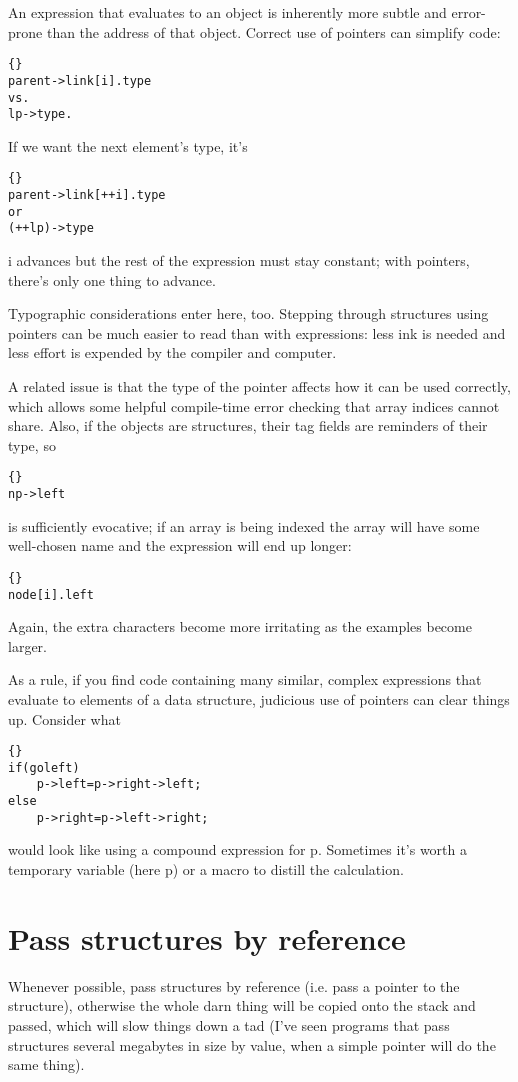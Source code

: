 \documentclass{report}
\begin{document}
An expression that evaluates to an object is inherently more subtle and error-prone than the address of that object. Correct use of pointers can simplify code: 
\begin{lstlisting}{}
parent->link[i].type
vs. 
lp->type.
\end{lstlisting}
If we want the next element's type, it's
\begin{lstlisting}{}
parent->link[++i].type
or 
(++lp)->type
\end{lstlisting}
i advances but the rest of the expression must stay constant; with pointers, there's only one thing to advance. 

Typographic considerations enter here, too. Stepping through structures using pointers can be much easier to read than with expressions: less ink is needed and less effort is expended by the compiler and computer.

A related issue is that the type of the pointer affects how it can be used correctly, which allows some helpful compile-time error checking that array indices cannot share. Also, if the objects are structures, their tag fields are reminders of their type, so 
\begin{lstlisting}{}
np->left
\end{lstlisting}
is sufficiently evocative; if an array is being indexed the array will have some well-chosen name and the expression will end up longer: 
\begin{lstlisting}{}
node[i].left
\end{lstlisting}
Again, the extra characters become more irritating as the examples become larger.

As a rule, if you find code containing many similar, complex expressions that evaluate to elements of a data structure, judicious use of pointers can clear things up. Consider what 
\begin{lstlisting}{}
if(goleft)
    p->left=p->right->left;
else
    p->right=p->left->right;
\end{lstlisting}
would look like using a compound expression for p. Sometimes it's worth a temporary variable (here p) or a macro to distill the calculation. 

\section{Pass structures by reference}
Whenever possible, pass structures by reference (i.e. pass a pointer to the structure), otherwise the whole darn thing will be copied onto the stack and passed, which will slow things down a tad (I've seen programs that pass structures several megabytes in size by value, when a simple pointer will do the same thing).
\end{document}

